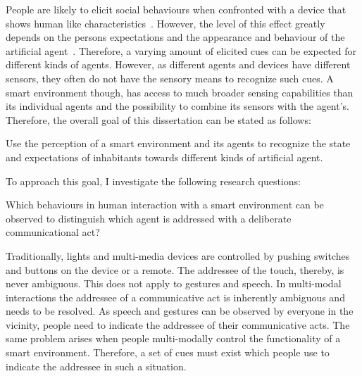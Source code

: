 People are likely to elicit social behaviours when confronted with a \gls{device} that shows human like characteristics~\cite{Reeves1996}.
However, the level of this effect greatly depends on the persons expectations and the appearance and behaviour of the \gls{artificial agent}~\cite{Hegel2008a}.
Therefore, a varying amount of elicited  cues can be expected for different kinds of agents.
However, as different agents and \glspl{device} have different sensors, they often do not have the sensory means to recognize such cues.
A \gls{smart environment} though, has access to much broader sensing capabilities than its individual agents and the possibility to combine its sensors with the agent's.
Therefore, the overall goal of this dissertation can be stated as follows:
\newcommand{\hypmain}{
	Use the perception of a \gls{smart environment} and its agents to recognize the \glsatt{conversation} state and expectations of inhabitants towards different kinds of \gls{artificial agent}.
	}
\begin{hyp1}
  \label{hyp1}
  \hypmain
\end{hyp1}
To approach this goal, I investigate the following research questions:
\newcommand{\hypaddress}{Which behaviours in \naive{} human interaction with a \gls{smart environment} can be observed  to distinguish which agent is addressed with a deliberate communicational act?}
\begin{hyp2}
	\label{hyp.address}
	\hypaddress
\end{hyp2}
Traditionally, lights and multi-media \glspl{device} are controlled by pushing switches and buttons on the \gls{device} or a remote.
The \gls{addressee} of the touch, thereby, is never ambiguous.
This does not apply to gestures and speech.
In multi-modal interactions the \gls{addressee} of a communicative act is inherently ambiguous and needs to be resolved.
As speech and gestures can be observed by everyone in the vicinity, people need to indicate the \gls{addressee} of their communicative acts.
The same problem arises when people multi-modally control the functionality of a \gls{smart environment}.
Therefore, a set of cues must exist which people use to indicate the \gls{addressee} in such a situation.
\newcommand{\hypmeka}{How can an \gls{artificial agent} visually recognize whether it was addressed by a person within its \gls{conversational group} or not?}
